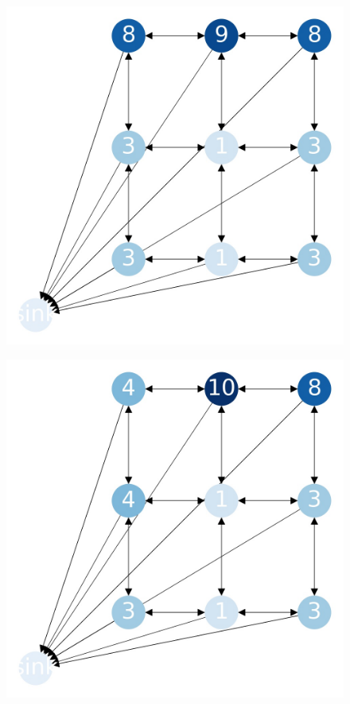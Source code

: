 \documentclass{beamer}
\begin{document}
\begin{frame}
  \begin{figure}[h!]
    \centering
      \includegraphics[scale=0.25]{sandpile_14}
  \end{figure}
\end{frame}


\begin{frame}
  \begin{figure}[h!]
    \centering
      \includegraphics[scale=0.25]{sandpile_15}
  \end{figure}
\end{frame}
\end{document}
